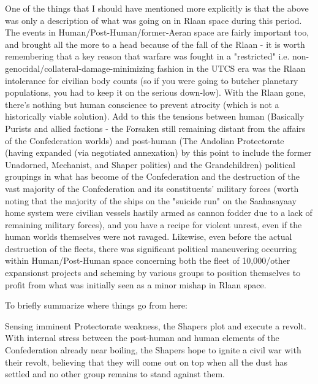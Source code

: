 One of the things that I should have mentioned more explicitly is that
the above was only a description of what was going on in Rlaan space
during this period. The events in Human/Post-Human/former-Aeran space
are fairly important too, and brought all the more to a head because
of the fall of the Rlaan - it is worth remembering that a key reason
that warfare was fought in a "restricted"
i.e. non-genocidal/collateral-damage-minimizing fashion in the UTCS
era was the Rlaan intolerance for civilian body counts (so if you were
going to butcher planetary populations, you had to keep it on the
serious down-low). With the Rlaan gone, there's nothing but human
conscience to prevent atrocity (which is not a historically viable
solution). Add to this the tensions between human (Basically Purists
and allied factions - the Forsaken still remaining distant from the
affairs of the Confederation worlds) and post-human (The Andolian
Protectorate (having expanded (via negotiated annexation) by this
point to include the former Unadorned, Mechanist, and Shaper polities)
and the Grandchildren) political groupings in what has become of the
Confederation and the destruction of the vast majority of the
Confederation and its constituents' military forces (worth noting that
the majority of the ships on the "suicide run" on the Saahasayaay home
system were civilian vessels hastily armed as cannon fodder due to a
lack of remaining military forces), and you have a recipe for violent
unrest, even if the human worlds themselves were not
ravaged. Likewise, even before the actual destruction of the fleets,
there was significant political maneuvering occurring within
Human/Post-Human space concerning both the fleet of 10,000/other
expansionst projects and scheming by various groups to position
themselves to profit from what was initially seen as a minor mishap in
Rlaan space.

To briefly summarize where things go from here: 

Sensing imminent Protectorate weakness, the Shapers plot and execute a
revolt. With internal stress between the post-human and human elements
of the Confederation already near boiling, the Shapers hope to ignite
a civil war with their revolt, believing that they will come out on
top when all the dust has settled and no other group remains to stand
against them.


